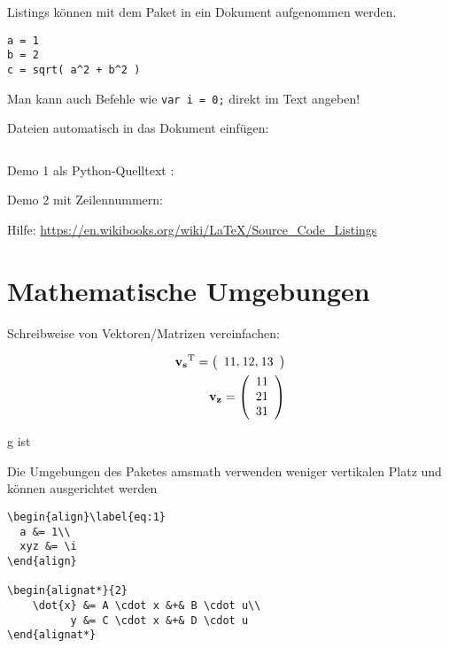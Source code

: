 Listings können mit dem Paket  in ein Dokument
aufgenommen werden.

\begin{lstlisting}[numbers=right]
a = 1
b = 2
c = sqrt( a^2 + b^2 )
\end{lstlisting}


Man kann auch Befehle wie \lstinline{var i = 0;} direkt im Text angeben!


Dateien automatisch in das Dokument einfügen:

\begin{verbatim}

\end{verbatim}


Demo 1 als Python-Quelltext
:


Demo 2 mit Zeilennummern:



Hilfe: \url{https://en.wikibooks.org/wiki/LaTeX/Source_Code_Listings}

\section{Mathematische Umgebungen}

Schreibweise von Vektoren/Matrizen vereinfachen:

\def\vk#1{\mathbf{#1}}
\def\tr#1{\ensuremath{#1^{\mathrm{T}}}}
\def\zvektor#1{\left(\begin{array}{c}#1\end{array}\right)}
\def\svektor#1{\left(\begin{array}{c@{,\:}c@{,\:}c}#1\end{array}\right)}
\def\matrix#1{\left(#1\right)}

\begin{align}
  \tr{\vk{v_s}} = \svektor{11&12&13}
\\
\vk{v_z} = \zvektor{11\\21\\31}
\end{align}

g ist 

Die Umgebungen des Paketes \textsf{amsmath} verwenden weniger
vertikalen Platz und können ausgerichtet werden

\begin{verbatim}
\begin{align}\label{eq:1}
  a &= 1\\
  xyz &= \i
\end{align}

\begin{alignat*}{2}
    \dot{x} &= A \cdot x &+& B \cdot u\\
          y &= C \cdot x &+& D \cdot u
\end{alignat*}

\end{verbatim}

